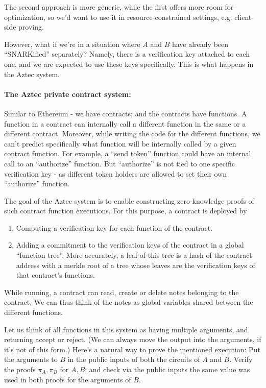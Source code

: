 \documentclass[11pt]{article} %
\newcommand{\prf}{\ensuremath{\mathsf{\pi}}\xspace}
\begin{document}
The second approach is more generic, while the first offers more room for optimization, so we'd want to use it in resource-constrained settings, e.g. client-side proving.


However, what if we're in a situation where $A$ and $B$ have already been ``SNARKified'' separately?
Namely, there is a verification key attached to each one, and we are expected to use these keys specifically.
This is what happens in the Aztec system.
\paragraph{The Aztec private contract system:}
 Similar to Ethereum - we have contracts; and the contracts have functions.
A function in a contract can internally call a different function in the same or a different contract. Moreover, while writing the code for the different functions,
we can't predict specifically what function will be internally called by a given contract function. For example, a ``send token'' function could have an internal call to an ``authorize'' function.
But ``authorize'' is not tied to one specific verification key - as different token holders are allowed to set their own ``authorize'' function.


The goal of the Aztec system is to enable constructing zero-knowledge proofs of such contract function executions.
For this purpose, a contract is deployed by 
\begin{enumerate}
\item  Computing a verification key for each function of the contract.
\item Adding a commitment to the verification keys of the contract in a global ``function tree''. More accurately, a leaf of this tree is a hash of the
contract address with a merkle root of a tree whose leaves are the verification keys of that contract's functions.

\end{enumerate}

While running, a contract can read, create or delete notes belonging to the contract.
We can thus think of the notes as global variables shared between the different functions.




Let us think of all functions in this system as having multiple arguments, and returning accept or reject. (We can always move the output into the arguments, if it's not of this form.)
Here's a natural way to prove the mentioned execution: Put the arguments to $B$ in the public inputs of both the circuits of $A$ and $B$.
Verify the proofs $\prf_A,\prf_B$ for $A,B$; and check via the public inputs the same value was used in both proofs for the arguments of $B$.
\end{document}
